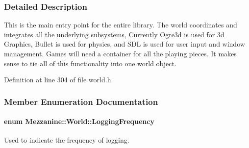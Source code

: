 \subsubsection{Detailed Description}
This is the main entry point for the entire library. The world coordinates and integrates all the underlying subsystems, Currently Ogre3d is used for 3d Graphics, Bullet is used for physics, and SDL is used for user input and window management. Games will need a container for all the playing pieces. It makes sense to tie all of this functionality into one world object. 

Definition at line 304 of file world.h.



\subsubsection{Member Enumeration Documentation}
\hypertarget{classMezzanine_1_1World_a535c832832bbdebcdc623c3472a32e25}{
\paragraph[{LoggingFrequency}]{\setlength{\rightskip}{0pt plus 5cm}enum {\bf Mezzanine::World::LoggingFrequency}}\hfill}
\label{classMezzanine_1_1World_a535c832832bbdebcdc623c3472a32e25}


Used to indicate the frequency of logging. 

